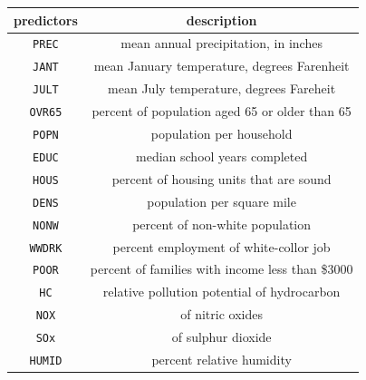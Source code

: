 \documentclass[]{book}
\theoremstyle{definition}
\theoremstyle{definition}
\theoremstyle{definition}
\theoremstyle{remark}
\begin{document}
\begin{longtable}[]{@{}cc@{}}
\toprule
predictors & description\tabularnewline
\midrule
\endhead
\texttt{PREC} & mean annual precipitation, in inches\tabularnewline
\texttt{JANT} & mean January temperature, degrees Farenheit\tabularnewline
\texttt{JULT} & mean July temperature, degrees Fareheit\tabularnewline
\texttt{OVR65} & percent of population aged 65 or older than 65\tabularnewline
\texttt{POPN} & population per household\tabularnewline
\texttt{EDUC} & median school years completed\tabularnewline
\texttt{HOUS} & percent of housing units that are sound\tabularnewline
\texttt{DENS} & population per square mile\tabularnewline
\texttt{NONW} & percent of non-white population\tabularnewline
\texttt{WWDRK} & percent employment of white-collor job\tabularnewline
\texttt{POOR} & percent of families with income less than \$3000\tabularnewline
\texttt{HC} & relative pollution potential of hydrocarbon\tabularnewline
\texttt{NOX} & of nitric oxides\tabularnewline
\texttt{SOx} & of sulphur dioxide\tabularnewline
\texttt{HUMID} & percent relative humidity\tabularnewline
\bottomrule
\end{longtable}
\end{document}

